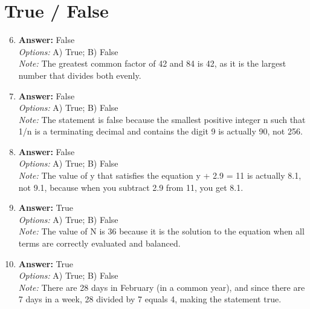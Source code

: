 \documentclass[12pt]{article}
\begin{document}
\section*{True / False}
\begin{enumerate}[label=\arabic*.]
\setcounter{enumi}{5}
\item \textbf{Answer:} False
\\ \textit{Options:} A) True; B) False
\\ \textit{Note:} The greatest common factor of 42 and 84 is 42, as it is the largest number that divides both evenly.
\item \textbf{Answer:} False
\\ \textit{Options:} A) True; B) False
\\ \textit{Note:} The statement is false because the smallest positive integer n such that 1/n is a terminating decimal and contains the digit 9 is actually 90, not 256.
\item \textbf{Answer:} False
\\ \textit{Options:} A) True; B) False
\\ \textit{Note:} The value of y that satisfies the equation y + 2.9 = 11 is actually 8.1, not 9.1, because when you subtract 2.9 from 11, you get 8.1.
\item \textbf{Answer:} True
\\ \textit{Options:} A) True; B) False
\\ \textit{Note:} The value of N is 36 because it is the solution to the equation when all terms are correctly evaluated and balanced.
\item \textbf{Answer:} True
\\ \textit{Options:} A) True; B) False
\\ \textit{Note:} There are 28 days in February (in a common year), and since there are 7 days in a week, 28 divided by 7 equals 4, making the statement true.
\end{enumerate}
\end{document}
